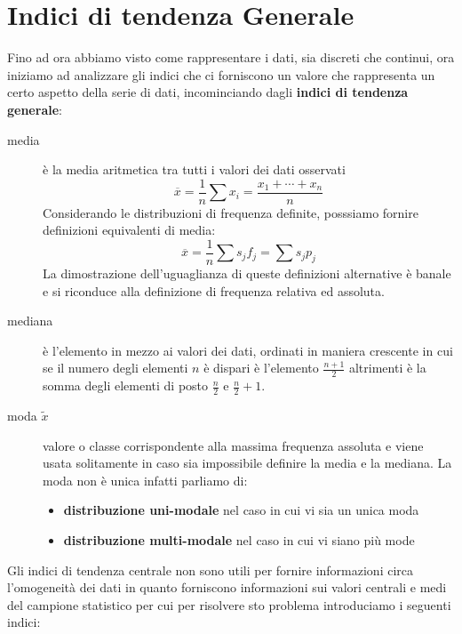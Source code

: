 \documentclass[a4paper,12pt, oneside]{book}
\begin{document}
\section{Indici di tendenza Generale}
Fino ad ora abbiamo visto come rappresentare i dati, sia discreti che continui, ora iniziamo ad analizzare gli indici
che ci forniscono un valore che rappresenta un certo aspetto della serie di dati, 
incominciando dagli \textbf{indici di tendenza generale}:
\begin{description}
    \item [media] è la media aritmetica tra tutti i valori dei dati osservati 
            \[ \overline{x} = \frac{1}{n} \sum x_i = \frac{x_1 + \cdots + x_n}{n} \]
            Considerando le distribuzioni di frequenza definite, posssiamo fornire definizioni equivalenti di media:
                \[ \overline{x} = \frac{1}{n} \sum s_j f_j = \sum s_j p_j \]
                La dimostrazione dell'uguaglianza di queste definizioni alternative è banale e si riconduce 
                alla definizione di frequenza relativa ed assoluta.

    \item [mediana] è l'elemento in mezzo ai valori dei dati, ordinati in maniera crescente
            in cui se il numero degli elementi $n$ è dispari è l'elemento $\frac{n + 1}{2}$
            altrimenti è la somma degli elementi di posto $\frac{n}{2}$ e $\frac{n}{2} + 1$.

    \item [moda $\widetilde{x}$] valore o classe corrispondente alla massima frequenza assoluta e viene usata 
            solitamente in caso sia impossibile definire la media e la mediana.\newline
            La moda non è unica infatti parliamo di:
            \begin{itemize}
                 \item \textbf{distribuzione uni-modale} nel caso in cui vi sia un unica moda
                 \item \textbf{distribuzione multi-modale} nel caso in cui vi siano più mode
            \end{itemize}
\end{description}
Gli indici di tendenza centrale non sono utili per fornire informazioni circa l'omogeneità dei dati in quanto forniscono 
informazioni sui valori centrali e medi del campione statistico per cui per risolvere sto problema introduciamo i seguenti indici:
\end{document}
